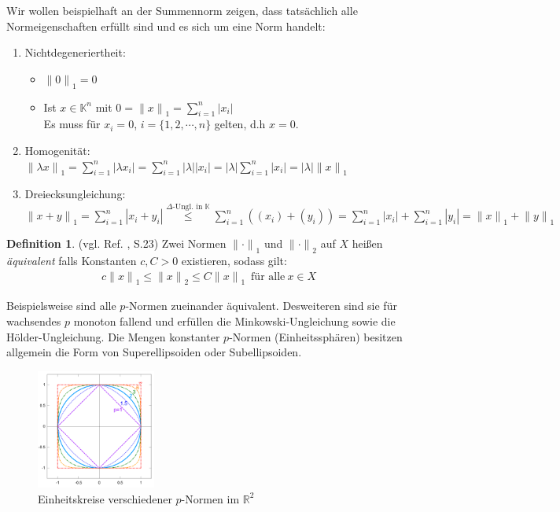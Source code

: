 \documentclass[10pt,a4paper]{article}
\theoremstyle{plain}
\theoremstyle{definition}
\newtheorem{definition}[satz]{Definition}
\newenvironment{dfi}{\begin{shaded}\begin{definition}}{\end{definition}\end{shaded}}
\theoremstyle{nonumberplain}
\newcommand{\R}{\mathbb{R}}
\newcommand{\K}{\mathbb{K}}
\begin{document}
\noindent Wir wollen beispielhaft an der Summennorm zeigen, dass tatsächlich alle Normeigenschaften erfüllt sind und es sich um eine Norm handelt:
\begin{enumerate}[label=(\roman*)]
\item Nichtdegeneriertheit:
\begin{itemize}
\item ${\|0\|}_1 = 0$
\item Ist $x  \in \K^n$ mit $0 = {\|x\|}_1 = \sum\limits_{i=1}^n{|x_i|}$\\ Es muss für $x_i = 0$, $i = \{1, 2, \cdots, n\}$ gelten, d.h $x = 0$.
\end{itemize}
\item Homogenität: ${\|\lambda x\|}_1 = \sum\limits_{i=1}^n{|\lambda x_i|} =  \sum\limits_{i=1}^n{|\lambda| |x_i|} = |\lambda| \sum\limits_{i=1}^n{|x_i|} = |\lambda| {\|x\|}_1$
\item Dreiecksungleichung:\\
 ${\|x + y\|}_1 = \sum\limits_{i=1}^n{|x_i + y_i|} \overset{\Delta\text{-Ungl. in }\K}\leq \sum\limits_{i=1}^n{((x_i) + (y_i))} = \sum\limits_{i=1}^n{|x_i|} + \sum\limits_{i=1}^n{|y_i|} = {\|x\|}_1 + {\|y\|}_1$
\end{enumerate}
\begin{dfi}
(vgl. Ref. \cite{Clason}, S.23) Zwei Normen ${\|\cdot\|}_1$ und ${\|\cdot\|}_2$ auf $X$ heißen \textit{äquivalent} falls Konstanten $c, C > 0$ existieren, sodass gilt:
\begin{align*}
\label{ung}
& c{\|x\|}_1 \leq {\|x\|}_2 \leq C{\|x\|}_1 \enspace \text{für alle} \: x \in X
\end{align*}
\end{dfi}
Beispielsweise sind alle $p$-Normen zueinander äquivalent. Desweiteren sind sie für wachsendes $p$ monoton fallend und erfüllen die Minkowski-Ungleichung sowie die Hölder-Ungleichung. Die Mengen konstanter $p$-Normen (Einheitssphären) besitzen allgemein die Form von Superellipsoiden oder Subellipsoiden.
\begin{figure}[h]
\centering
\includegraphics[width=0.35\textwidth]{pictures/einheitsphaeren.png}
\caption{Einheitskreise verschiedener $p$-Normen im $\R^2$ \cite{Einheitsphären}}
\end{figure}
\end{document}

